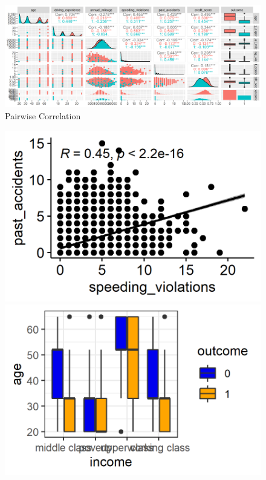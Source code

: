 \documentclass[a4paper, 11pt]{article}
\begin{document}
\begin{figure}[H]
	\includegraphics[width = \textwidth]{figure1.png}
	\caption{Pairwise Correlation}
	\label{Figure1}
\end{figure}


\begin{figure}[H]
	\centering
	\begin{minipage}[b]{0.4\textwidth}
		\includegraphics[width=\textwidth]{figure2.png}
		\caption{}
	\end{minipage}
	\begin{minipage}[b]{0.4\textwidth}
		\includegraphics[width=\textwidth]{figure3.png}

\end{minipage}
\end{figure}
\end{document}
